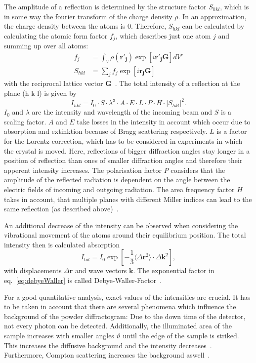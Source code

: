 The amplitude of a reflection is determined by the structure factor $S_{hkl}$, which is in some way the fourier transform of the charge density $\rho$. In an approximation, the charge density between the atoms is 0. Therefore, $S_{hkl}$ can be calculated by calculating the atomic form factor $f_j$, which describes just one atom $j$ and summing up over all atoms:
\begin{align}
    f_j &= \int_V \rho(\mathbf{r'_j}) \exp[i\mathbf{r'_jG}] dV' \\
    S_{hkl} &= \sum_{j} f_j \exp[i\mathbf{r_jG}]
\end{align}
with the reciprocal lattice vector $\mathbf{G}$~\cite{Bohm.2021}. The total intensity of a reflection at the plane (h k l) is given by
\begin{equation}
    I_{hkl} = I_0 \cdot S \cdot \lambda^3 \cdot A \cdot E \cdot L \cdot P \cdot H \cdot |S_{hkl}|^2.
\end{equation}
$I_0$ and $\lambda$ are the intensity and wavelength of the incoming beam and $S$ is a scaling factor. $A$ and $E$ take losses in the intensity in account which occur due to absorption and extinktion because of Bragg scattering respectively.  $L$ is a factor for the Lorentz correction, which has to be considered in experiments in which the crystal is moved. Here, reflections of bigger diffraction angles stay longer in a position of reflection than ones of smaller diffraction angles and therefore their apperent intensity increases. The polarisation factor $P$ considers that the amplitude of the reflected radiation is dependent on the angle between the electric fields of incoming and outgoing radiation. The area frequency factor $H$ takes in account, that multiple planes with different Miller indices can lead to the same reflection (as described above)~\cite{Bohm.2021}. \par 
An additional decrease of the intensity can be observed when considering the vibrational movement of the atoms around their equilibrium position. The total intensity then is calculated absorption
\begin{equation}
    I_{tot} = I_0 \exp[-\frac{1}{3}\langle \Delta \mathbf{r}^2 \rangle \cdot \Delta \mathbf{k}^2],
    \label{eq:debyeWaller}
\end{equation} 
with displacements $\Delta \mathbf{r}$ and wave vectors $\mathbf{k}$. The exponential factor in eq.~\ref{eq:debyeWaller} is called Debye-Waller-Factor~\cite{Demtroeder.2016}. \par 
For a good quantitative analysis, exact values of the intensities are crucial. It has to be taken in account that there are several phenomena which influence the background of the powder diffractogram: Due to the down time of the detector, not every photon can be detected. Additionally, the illuminated area of the sample increases with smaller angles $\vartheta$ until the edge of the sample is striked. This increases the diffusive background and the intensity decreases~\cite{Schwarzenbach.2001}. Furthermore, Compton scattering increases the background aswell~\cite{Bohm.2021}.